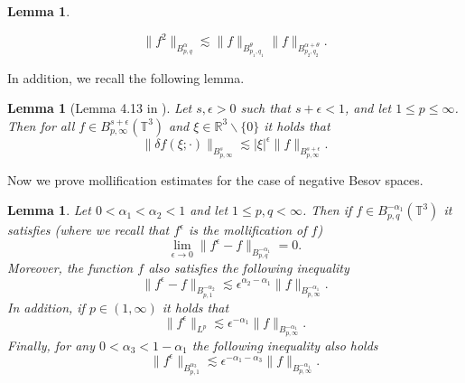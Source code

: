 \documentclass[12pt,a4paper]{article}
\newtheorem{lemma}[theorem]{Lemma}
\theoremstyle{definition}
\theoremstyle{remark}
\numberwithin{equation}{section}
\begin{document}
\begin{appendices}
\begin{lemma}
\begin{itemize}
\begin{equation}
        \lVert f^2 \rVert_{B^\alpha_{p,q}} \lesssim \lVert f \rVert_{B^\theta_{p_1,q_1}} \lVert f \rVert_{B^{\alpha+\theta}_{p_2,q_2}}.
    \end{equation}
\end{itemize}
\end{lemma}
In addition, we recall the following lemma.
\begin{lemma}[Lemma 4.13 in \cite{boutroshydrostatic}] \label{diffquotientlemma}
Let $s, \epsilon > 0$ such that $s + \epsilon < 1$, and let $1 \leq p \leq \infty$. Then for all $f \in B^{s+\epsilon}_{p,\infty} (\mathbb{T}^3)$ and $\xi \in \mathbb{R}^3 \backslash \{ 0 \}$ it holds that
\begin{equation}
\lVert \delta f (\xi;\cdot) \rVert_{B^s_{p,\infty}} \lesssim \lvert \xi \rvert^\epsilon \lVert f \rVert_{B^{s+\epsilon}_{p,\infty}}.
\end{equation}
\end{lemma}
Now we prove mollification estimates for the case of negative Besov spaces.
\begin{lemma} \label{mollificationbesovlemma}
Let $0 < \alpha_1 < \alpha_2 < 1$ and let $1 \leq p, q < \infty$. Then if $f \in B^{-\alpha_1}_{p,q} (\mathbb{T}^3)$ it satisfies (where we recall that $f^\epsilon$ is the mollification of $f$)
\begin{equation} \label{mollificationbesovineq1}
\lim_{\epsilon \rightarrow 0} \lVert f^\epsilon - f  \rVert_{B^{-\alpha_1}_{p,q}} = 0.
\end{equation}
Moreover, the function $f$ also satisfies the following inequality
\begin{equation} \label{mollificationbesovineq2}
\lVert f^\epsilon - f  \rVert_{B^{-\alpha_2}_{p,1}} \lesssim \epsilon^{\alpha_2 - \alpha_1} \lVert f \rVert_{B^{-\alpha_1}_{p,\infty}}.
\end{equation}
In addition, if $p \in (1,\infty)$ it holds that
\begin{equation} \label{mollificationbesovineq3}
\lVert f^\epsilon \rVert_{L^p} \lesssim \epsilon^{-\alpha_1} \lVert f \rVert_{B^{-\alpha_1}_{p,\infty}}.
\end{equation}
Finally, for any $0 < \alpha_3 < 1 - \alpha_1$ the following inequality also holds
\begin{equation} \label{mollificationbesovineq4}
\lVert f^\epsilon \rVert_{B^{\alpha_3}_{p,1}} \lesssim \epsilon^{-\alpha_1 - \alpha_3} \lVert f \rVert_{B^{-\alpha_1}_{p,\infty}}.
\end{equation}
\end{lemma}

\end{appendices}
\end{document}
